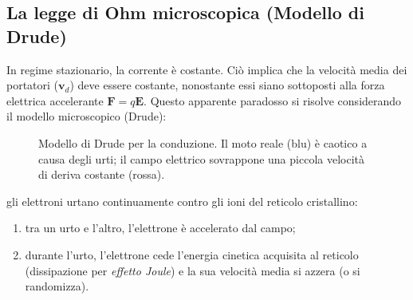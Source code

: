 \documentclass[a4paper,11pt]{report}
\begin{document}
\subsection{La legge di Ohm microscopica (Modello di Drude)}
In regime stazionario, la corrente è costante. Ciò implica che la velocità media dei portatori ($\bm{v}_d$) deve essere costante, nonostante essi siano sottoposti alla forza elettrica accelerante $\bm{F} = q\bm{E}$.
Questo apparente paradosso si risolve considerando il modello microscopico (Drude): 
\begin{figure}[htbp]
    \centering
    
    \caption{Modello di Drude per la conduzione. Il moto reale (blu) è caotico a causa degli urti; il campo elettrico sovrappone una piccola velocità di deriva costante (rossa).}
    \label{fig:drude_model}
\end{figure}
gli elettroni urtano continuamente contro gli ioni del reticolo cristallino:
\begin{enumerate}
    \item tra un urto e l'altro, l'elettrone è accelerato dal campo;
    \item durante l'urto, l'elettrone cede l'energia cinetica acquisita al reticolo (dissipazione per \textit{effetto Joule}) e la sua velocità media si azzera (o si randomizza).
\end{enumerate}
\end{document}

